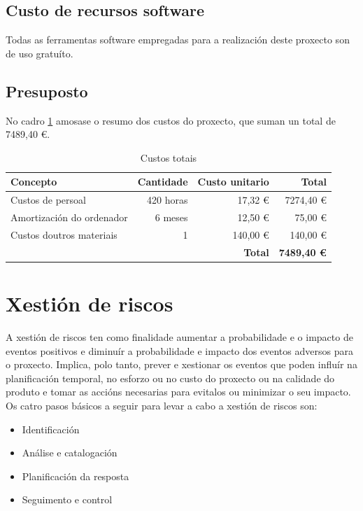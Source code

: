 \subsection{Custo de recursos software}
Todas as ferramentas software empregadas para a realización deste proxecto son de uso gratuíto.

\subsection{Presuposto}
No cadro \ref{tab:presuposto} amosase o resumo dos custos do proxecto, que suman un total de 7489,40 \euro.
\begin{table}[H]
\centering
\begin{tabularx}{\textwidth}{Xrrr} \toprule
	Concepto & Cantidade & Custo unitario & Total \\
	\midrule
	Custos de persoal & 420 horas & 17,32 \euro & 7274,40 \euro \\
	Amortización do ordenador & 6 meses & 12,50 \euro & 75,00 \euro \\
	Custos doutros materiais & 1 & 140,00 \euro & 140,00 \euro \\
	\midrule
	\multicolumn{3}{r}{\textbf{Total}} & \textbf{7489,40 \euro} \\
	\bottomrule
\end{tabularx}
\caption{Custos totais}
\label{tab:presuposto}
\end{table}

\section{Xestión de riscos}
A xestión de riscos ten como finalidade aumentar a probabilidade e o impacto de eventos positivos e diminuír a probabilidade e impacto dos eventos adversos para o proxecto. Implica, polo tanto, prever e xestionar os eventos que poden influír na planificación temporal, no esforzo ou no custo do proxecto ou na calidade do produto e tomar as accións necesarias para evitalos ou minimizar o seu impacto. Os catro pasos básicos a seguir para levar a cabo a xestión de riscos son:
\begin{itemize}
\item Identificación
\item Análise e catalogación
\item Planificación da resposta
\item Seguimento e control
\end{itemize}

